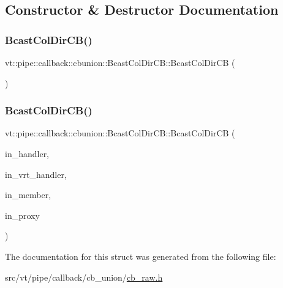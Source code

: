 \subsection{Constructor \& Destructor Documentation}
\mbox{\label{structvt_1_1pipe_1_1callback_1_1cbunion_1_1_bcast_col_dir_c_b_a38d5f3f68d4ca7752835cae912d4f3a7}} 
\subsubsection{\texorpdfstring{Bcast\+Col\+Dir\+C\+B()}{BcastColDirCB()}\hspace{0.1cm}{\footnotesize\ttfamily [1/2]}}
{\footnotesize\ttfamily vt\+::pipe\+::callback\+::cbunion\+::\+Bcast\+Col\+Dir\+C\+B\+::\+Bcast\+Col\+Dir\+CB (\begin{DoxyParamCaption}{ }\end{DoxyParamCaption})\hspace{0.3cm}{\ttfamily [default]}}

\mbox{\label{structvt_1_1pipe_1_1callback_1_1cbunion_1_1_bcast_col_dir_c_b_aa10324976fb406cc31bee9625f70dad7}} 
\subsubsection{\texorpdfstring{Bcast\+Col\+Dir\+C\+B()}{BcastColDirCB()}\hspace{0.1cm}{\footnotesize\ttfamily [2/2]}}
{\footnotesize\ttfamily vt\+::pipe\+::callback\+::cbunion\+::\+Bcast\+Col\+Dir\+C\+B\+::\+Bcast\+Col\+Dir\+CB (\begin{DoxyParamCaption}\item[{\hyperlink{namespacevt_af64846b57dfcaf104da3ef6967917573}{Handler\+Type} const \&}]{in\+\_\+handler,  }\item[{\hyperlink{structvt_1_1pipe_1_1callback_1_1_callback_proxy_bcast_direct_a543cd86434430bd048952534f4fbc128}{Callback\+Proxy\+Bcast\+Direct\+::\+Auto\+Handler\+Type} const \&}]{in\+\_\+vrt\+\_\+handler,  }\item[{bool const \&}]{in\+\_\+member,  }\item[{\hyperlink{namespacevt_a1b417dd5d684f045bb58a0ede70045ac}{Virtual\+Proxy\+Type} const \&}]{in\+\_\+proxy }\end{DoxyParamCaption})\hspace{0.3cm}{\ttfamily [inline]}}



The documentation for this struct was generated from the following file\+:\begin{DoxyCompactItemize}
\item 
src/vt/pipe/callback/cb\+\_\+union/\hyperlink{cb__raw_8h}{cb\+\_\+raw.\+h}\end{DoxyCompactItemize}
